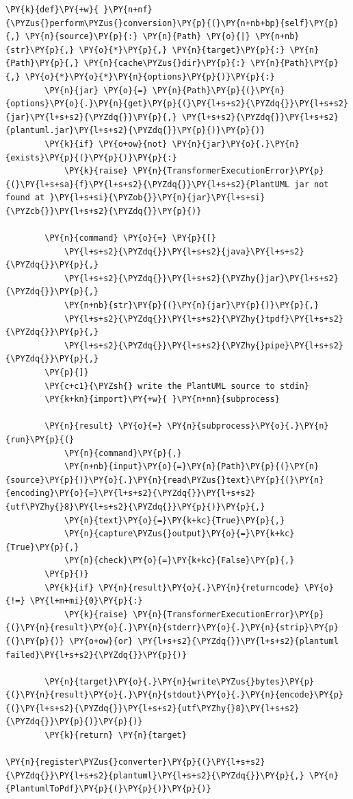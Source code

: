 \documentclass[a4paper,twoside]{article}
\begin{document}
\begin{tscode}[lang=python, engine=pygments]
\begin{Verbatim}[commandchars=\\\{\},breaklines, breakanywhere, commandchars=\\\{\}]
    \PY{k}{def}\PY{+w}{ }\PY{n+nf}{\PYZus{}perform\PYZus{}conversion}\PY{p}{(}\PY{n+nb+bp}{self}\PY{p}{,} \PY{n}{source}\PY{p}{:} \PY{n}{Path} \PY{o}{|} \PY{n+nb}{str}\PY{p}{,} \PY{o}{*}\PY{p}{,} \PY{n}{target}\PY{p}{:} \PY{n}{Path}\PY{p}{,} \PY{n}{cache\PYZus{}dir}\PY{p}{:} \PY{n}{Path}\PY{p}{,} \PY{o}{*}\PY{o}{*}\PY{n}{options}\PY{p}{)}\PY{p}{:}
        \PY{n}{jar} \PY{o}{=} \PY{n}{Path}\PY{p}{(}\PY{n}{options}\PY{o}{.}\PY{n}{get}\PY{p}{(}\PY{l+s+s2}{\PYZdq{}}\PY{l+s+s2}{jar}\PY{l+s+s2}{\PYZdq{}}\PY{p}{,} \PY{l+s+s2}{\PYZdq{}}\PY{l+s+s2}{plantuml.jar}\PY{l+s+s2}{\PYZdq{}}\PY{p}{)}\PY{p}{)}
        \PY{k}{if} \PY{o+ow}{not} \PY{n}{jar}\PY{o}{.}\PY{n}{exists}\PY{p}{(}\PY{p}{)}\PY{p}{:}
            \PY{k}{raise} \PY{n}{TransformerExecutionError}\PY{p}{(}\PY{l+s+sa}{f}\PY{l+s+s2}{\PYZdq{}}\PY{l+s+s2}{PlantUML jar not found at }\PY{l+s+si}{\PYZob{}}\PY{n}{jar}\PY{l+s+si}{\PYZcb{}}\PY{l+s+s2}{\PYZdq{}}\PY{p}{)}

        \PY{n}{command} \PY{o}{=} \PY{p}{[}
            \PY{l+s+s2}{\PYZdq{}}\PY{l+s+s2}{java}\PY{l+s+s2}{\PYZdq{}}\PY{p}{,}
            \PY{l+s+s2}{\PYZdq{}}\PY{l+s+s2}{\PYZhy{}jar}\PY{l+s+s2}{\PYZdq{}}\PY{p}{,}
            \PY{n+nb}{str}\PY{p}{(}\PY{n}{jar}\PY{p}{)}\PY{p}{,}
            \PY{l+s+s2}{\PYZdq{}}\PY{l+s+s2}{\PYZhy{}tpdf}\PY{l+s+s2}{\PYZdq{}}\PY{p}{,}
            \PY{l+s+s2}{\PYZdq{}}\PY{l+s+s2}{\PYZhy{}pipe}\PY{l+s+s2}{\PYZdq{}}\PY{p}{,}
        \PY{p}{]}
        \PY{c+c1}{\PYZsh{} write the PlantUML source to stdin}
        \PY{k+kn}{import}\PY{+w}{ }\PY{n+nn}{subprocess}

        \PY{n}{result} \PY{o}{=} \PY{n}{subprocess}\PY{o}{.}\PY{n}{run}\PY{p}{(}
            \PY{n}{command}\PY{p}{,}
            \PY{n+nb}{input}\PY{o}{=}\PY{n}{Path}\PY{p}{(}\PY{n}{source}\PY{p}{)}\PY{o}{.}\PY{n}{read\PYZus{}text}\PY{p}{(}\PY{n}{encoding}\PY{o}{=}\PY{l+s+s2}{\PYZdq{}}\PY{l+s+s2}{utf\PYZhy{}8}\PY{l+s+s2}{\PYZdq{}}\PY{p}{)}\PY{p}{,}
            \PY{n}{text}\PY{o}{=}\PY{k+kc}{True}\PY{p}{,}
            \PY{n}{capture\PYZus{}output}\PY{o}{=}\PY{k+kc}{True}\PY{p}{,}
            \PY{n}{check}\PY{o}{=}\PY{k+kc}{False}\PY{p}{,}
        \PY{p}{)}
        \PY{k}{if} \PY{n}{result}\PY{o}{.}\PY{n}{returncode} \PY{o}{!=} \PY{l+m+mi}{0}\PY{p}{:}
            \PY{k}{raise} \PY{n}{TransformerExecutionError}\PY{p}{(}\PY{n}{result}\PY{o}{.}\PY{n}{stderr}\PY{o}{.}\PY{n}{strip}\PY{p}{(}\PY{p}{)} \PY{o+ow}{or} \PY{l+s+s2}{\PYZdq{}}\PY{l+s+s2}{plantuml failed}\PY{l+s+s2}{\PYZdq{}}\PY{p}{)}

        \PY{n}{target}\PY{o}{.}\PY{n}{write\PYZus{}bytes}\PY{p}{(}\PY{n}{result}\PY{o}{.}\PY{n}{stdout}\PY{o}{.}\PY{n}{encode}\PY{p}{(}\PY{l+s+s2}{\PYZdq{}}\PY{l+s+s2}{utf\PYZhy{}8}\PY{l+s+s2}{\PYZdq{}}\PY{p}{)}\PY{p}{)}
        \PY{k}{return} \PY{n}{target}

\PY{n}{register\PYZus{}converter}\PY{p}{(}\PY{l+s+s2}{\PYZdq{}}\PY{l+s+s2}{plantuml}\PY{l+s+s2}{\PYZdq{}}\PY{p}{,} \PY{n}{PlantumlToPdf}\PY{p}{(}\PY{p}{)}\PY{p}{)}
\end{Verbatim}
\end{tscode}
\end{document}
